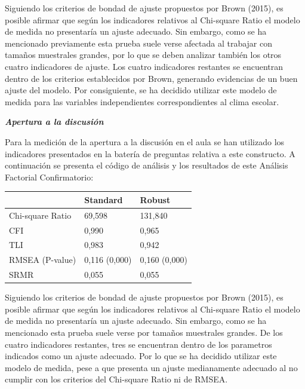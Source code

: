 \documentclass[12pt,twoside]{templates/facsothesis}
\begin{document}
Siguiendo los criterios de bondad de ajuste propuestos por Brown (2015), es posible afirmar que según los indicadores relativos al Chi-square Ratio el modelo de medida no presentaría un ajuste adecuado. Sin embargo, como se ha mencionado previamente esta prueba suele verse afectada al trabajar con tamaños muestrales grandes, por lo que se deben analizar también los otros cuatro indicadores de ajuste. Los cuatro indicadores restantes se encuentran dentro de los criterios establecidos por Brown, generando evidencias de un buen ajuste del modelo. Por consiguiente, se ha decidido utilizar este modelo de medida para las variables independientes correspondientes al clima escolar.

\textbf{\emph{Apertura a la discusión}}

Para la medición de la apertura a la discusión en el aula se han utilizado los indicadores presentados en la batería de preguntas relativa a este constructo. A continuación se presenta el código de análisis y los resultados de este Análisis Factorial Confirmatorio:

\begin{longtable}[]{@{}lll@{}}
\toprule
& Standard & Robust \\
\midrule
\endhead
Chi-square Ratio & 69,598 & 131,840 \\
CFI & 0,990 & 0,965 \\
TLI & 0,983 & 0,942 \\
RMSEA (P-value) & 0,116 (0,000) & 0,160 (0,000) \\
SRMR & 0,055 & 0,055 \\
\bottomrule
\end{longtable}

Siguiendo los criterios de bondad de ajuste propuestos por Brown (2015), es posible afirmar que según los indicadores relativos al Chi-square Ratio el modelo de medida no presentaría un ajuste adecuado. Sin embargo, como se ha mencionado esta prueba suele verse por tamaños muestrales grandes. De los cuatro indicadores restantes, tres se encuentran dentro de los parametros indicados como un ajuste adecuado. Por lo que se ha decidido utilizar este modelo de medida, pese a que presenta un ajuste medianamente adecuado al no cumplir con los criterios del Chi-square Ratio ni de RMSEA.



\end{document}
